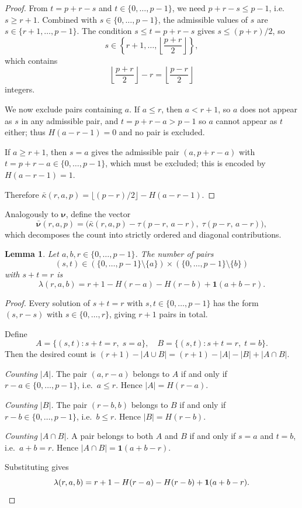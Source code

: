 \documentclass[12pt]{article}
\newtheorem{lemma}[theorem]{Lemma}
\begin{document}
\begin{proof}
From $t = p+r-s$ and $t \in \{0,\dots,p-1\}$, we need
$p+r-s \le p-1$, i.e.\ $s \ge r+1$.
Combined with $s \in \{0,\dots,p-1\}$, the admissible values of $s$
are $s \in \{r+1,\dots,p-1\}$.
The condition $s \le t = p+r-s$ gives $s \le (p+r)/2$, so
\[
s \in \left\{r+1,\dots,\left\lfloor\frac{p+r}{2}\right\rfloor\right\},
\]
which contains
\[
\left\lfloor\frac{p+r}{2}\right\rfloor - r
= \left\lfloor\frac{p-r}{2}\right\rfloor
\]
integers.

We now exclude pairs containing $a$.
If $a \le r$, then $a < r+1$, so $a$ does not appear as $s$ in
any admissible pair, and $t = p+r-a > p-1$ so $a$ cannot appear
as $t$ either; thus $H(a-r-1) = 0$ and no pair is excluded.

If $a \ge r+1$, then $s = a$ gives the admissible pair
$(a, p+r-a)$ with $t = p+r-a \in \{0,\dots,p-1\}$,
which must be excluded; this is encoded by $H(a-r-1) = 1$.

Therefore $\bar{\kappa}(r,a,p) =
\lfloor(p-r)/2\rfloor - H(a-r-1)$.
\end{proof}

Analogously to $\bm{\nu}$, define the vector
\[
\bar{\bm{\nu}}(r,a,p)
=
\bigl(\bar{\kappa}(r,a,p) - \tau(p-r,\,a-r),\;
      \tau(p-r,\,a-r)\bigr),
\]
which decomposes the count into strictly ordered and diagonal
contributions.

\begin{lemma}\label{lem:lambda}
Let $a,b,r \in \{0,\dots,p-1\}$.
The number of pairs
\[
(s,t)
\in
(\{0,\dots,p-1\}\setminus\{a\})
\times
(\{0,\dots,p-1\}\setminus\{b\})
\]
with $s+t=r$ is
\[
\lambda(r,a,b)
=
r+1-H(r-a)-H(r-b)+\mathbf{1}(a+b-r).
\]
\end{lemma}

\begin{proof}
Every solution of $s+t=r$ with $s,t \in \{0,\dots,p-1\}$ has the
form $(s,r-s)$ with $s \in \{0,\dots,r\}$, giving $r+1$ pairs in
total.

Define
\[
A = \{(s,t): s+t=r,\; s=a\},
\quad
B = \{(s,t): s+t=r,\; t=b\}.
\]
Then the desired count is
$(r+1) - |A \cup B| = (r+1) - |A| - |B| + |A \cap B|$.

\textit{Counting $|A|$.}
The pair $(a, r-a)$ belongs to $A$ if and only if
$r-a \in \{0,\dots,p-1\}$, i.e.\ $a \le r$.
Hence $|A| = H(r-a)$.

\textit{Counting $|B|$.}
The pair $(r-b, b)$ belongs to $B$ if and only if
$r-b \in \{0,\dots,p-1\}$, i.e.\ $b \le r$.
Hence $|B| = H(r-b)$.

\textit{Counting $|A \cap B|$.}
A pair belongs to both $A$ and $B$ if and only if $s=a$ and $t=b$,
i.e.\ $a+b=r$. Hence
$|A \cap B| = \mathbf{1}(a+b-r)$.

Substituting gives
\[
\lambda(r,a,b)
= r+1-H(r-a)-H(r-b)+\mathbf{1}(a+b-r). \qedhere
\]
\end{proof}
\end{document}
